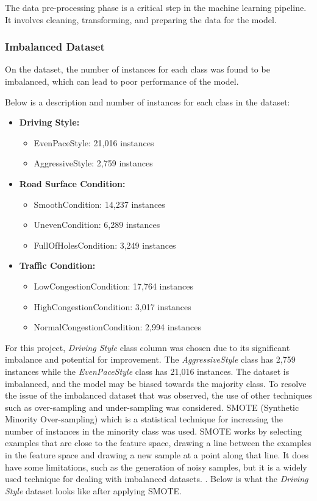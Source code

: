 \documentclass[10pt,journal,compsoc]{IEEEtran}
\begin{document}
The data pre-processing phase is a critical step in the machine learning pipeline. It involves cleaning, transforming, and preparing the data for the model. 

\subsubsection{Imbalanced Dataset}
On the dataset, the number of instances for each class was found to be imbalanced, which can lead to poor performance of the model. 

Below is a description and number of instances for each class in the dataset:

\begin{itemize}
    \item \textbf{Driving Style:}
    \begin{itemize}
        \item EvenPaceStyle: 21,016 instances
        \item AggressiveStyle: 2,759 instances
    \end{itemize}
    \item \textbf{Road Surface Condition:}
    \begin{itemize}
        \item SmoothCondition: 14,237 instances
        \item UnevenCondition: 6,289 instances
        \item FullOfHolesCondition: 3,249 instances
    \end{itemize}
    \item \textbf{Traffic Condition:}
    \begin{itemize}
        \item LowCongestionCondition: 17,764 instances
        \item HighCongestionCondition: 3,017 instances
        \item NormalCongestionCondition: 2,994 instances
    \end{itemize}
\end{itemize}

For this project, \textit{Driving Style} class column was chosen due to its significant imbalance and potential for improvement. 
The \textit{AggressiveStyle} class has 2,759 instances while the \textit{EvenPaceStyle} class has 21,016 instances. The dataset is imbalanced, 
and the model may be biased towards the majority class. To resolve the issue of the imbalanced dataset that was observed, the use of other techniques such as over-sampling and under-sampling was considered.
SMOTE (Synthetic Minority Over-sampling) which is a statistical technique for increasing the number of instances in the minority class was used. SMOTE works by selecting
examples that are close to the feature space, drawing a line between the examples in the feature space and drawing a new sample at a point along that line. 
It does have some limitations, such as the generation of noisy samples, but it is a widely used technique for dealing with imbalanced datasets. \cite{fernandez2018smote}. 
Below is what the \textit{Driving Style} dataset looks like after applying SMOTE.
\end{document}
